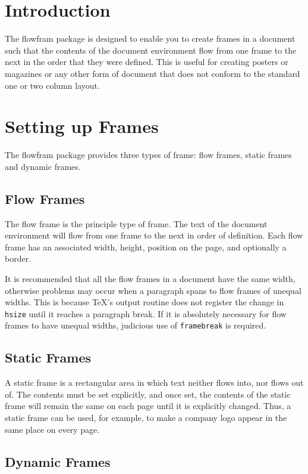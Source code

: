 \documentclass[a0]{a0poster}
\newcommand{\sty}[1]{\textsf{#1}}
\newcommand{\env}[1]{\textsf{#1}}
\newcommand{\cmdname}[1]{\texttt{\symbol{92}#1}}
\begin{document}
\section{Introduction}

The \sty{flowfram} package is designed to enable you to create
frames in a document such that the 
contents of the \env{document} environment flow from one 
frame to the next in the order that they were defined.  
This is useful for creating posters
or magazines or any other form of document that does not 
conform to the standard one or two column layout.

\section{Setting up Frames}

The \sty{flowfram} package provides three types of frame:
{flow frames}, {static 
frames} and {dynamic frames}.

\subsection{Flow Frames}

The flow frame is the principle type of frame.
The text of the \env{document} environment will flow from 
one frame to the next in order of definition. Each 
flow frame has an associated width, height, 
position on the page, and optionally a border.

It is recommended that all the flow frames in a document
have the same width, otherwise problems may occur
when a paragraph spans to flow frames of unequal
widths. This is because \TeX's output routine does not
register the change in \cmdname{hsize} until it reaches
a paragraph break. If it is absolutely necessary for 
flow frames to have unequal widths, judicious use of
\cmdname{framebreak} is required.

\subsection{Static Frames}

A static frame is a rectangular area in which text neither
flows into, nor flows out of.  The contents must be set
explicitly, and once set, the contents of the static frame will
remain the same on each page until it is explicitly 
changed.  Thus, a static frame can be used, for example, to make 
a company logo appear in the same place on every page.

\subsection{Dynamic Frames}
\end{document}
